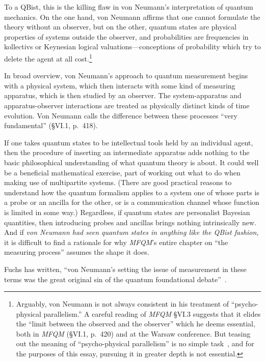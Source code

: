 \documentclass[aps,pra,superscriptaddress,12pt,tightenlines,nofootinbib]{revtex4-2}
\newcommand{\MFQM}{\textsl{MFQM}}
\begin{document}
To a QBist, this is the killing flaw in von Neumann's interpretation
of quantum mechanics.  On the one hand, von Neumann affirms that one
cannot formulate the theory without an observer, but on the other,
quantum states are physical properties of systems outside the
observer, and probabilities are frequencies in kollectivs or Keynesian
logical valuations---conceptions of probability which try to delete
the agent at all cost.\footnote{Arguably, von Neumann is not always
  consistent in his treatment of ``psycho-physical parallelism.''  A
  careful reading of \MFQM{} \S VI.3 suggests that it elides the
  ``limit between the observed and the observer'' which he deems
  essential, both in \MFQM{} (\S VI.1, p.\ 420) and at the Warsaw
  conference.  But teasing out the meaning of ``psycho-physical
  parallelism'' is no simple task~\cite{HayPeres1998}, and for the
  purposes of this essay, pursuing it in greater depth is not
  essential.}



In broad overview, von Neumann's approach to quantum measurement
begins with a physical system, which then interacts with some kind of
measuring apparatus, which is then studied by an observer.  The
system-apparatus and apparatus-observer interactions are treated as
physically distinct kinds of time evolution.  Von Neumann calls the
difference between these processes ``very fundamental'' (\S VI.1,
p.\ 418).

If one takes quantum states to be intellectual tools held by an
individual agent, then the procedure of inserting an intermediate
apparatus adds nothing to the basic philosophical understanding of
what quantum theory is about.  It could well be a beneficial
mathematical exercise, part of working out what to do when making use
of multipartite systems.  (There are good practical reasons to
understand how the quantum formalism applies to a system one of whose
parts is a probe or an ancilla for the other, or is a communication
channel whose function is limited in some way.)  Regardless, if quantum
states are personalist Bayesian quantities, then introducing probes
and ancillas brings nothing intrinsically new.  And if \emph{von
  Neumann had seen quantum states in anything like the QBist fashion,}
it is difficult to find a rationale for why \MFQM's entire chapter on
``the measuring process'' assumes the shape it does.

Fuchs has written, ``von Neumann's setting the issue of measurement in
these terms was the great original sin of the quantum foundational
debate''~\cite[p.\ 2035]{Fuchs2014}.
\end{document}
